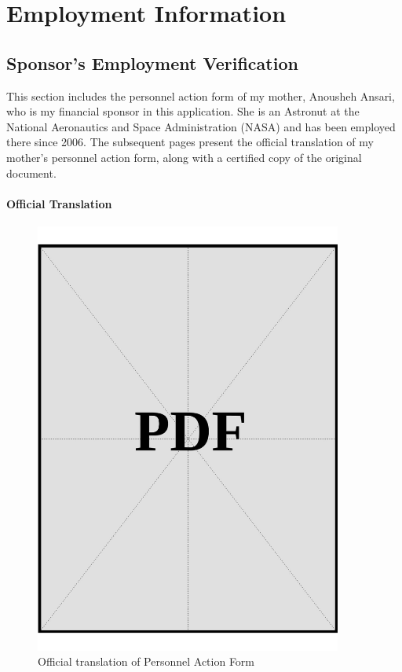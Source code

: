 \chapter{Employment Information}
\label{sec:employment-information}


\section{Sponsor's Employment Verification}

\noindent
This section includes the personnel action form of my mother, Anousheh Ansari, who is my financial sponsor in this application. She is an Astronut at the National Aeronautics and Space Administration (NASA) and has been employed there since 2006. The subsequent pages present the official translation of my mother's personnel action form, along with a certified copy of the original document.


\clearpage

\subsubsection*{Official Translation}
\vspace*{\fill}
\begin{figure}[H]
    \centering
    \includegraphics[page=1, width=0.9\textwidth]{../docs/sponsor/employment/employment-letter-official-translation.pdf}
    \caption{Official translation of Personnel Action Form}
    \label{fig:paf-official-trans}
\end{figure}
\vspace*{\fill}

